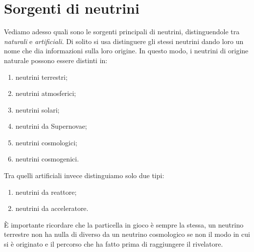     \section{Sorgenti di neutrini}
        Vediamo adesso quali sono le sorgenti principali di neutrini, distinguendole tra \emph{naturali} e \emph{artificiali}. Di solito si usa distinguere gli stessi neutrini dando loro un nome che dia informazioni sulla loro origine. In questo modo, i neutrini di origine naturale possono essere distinti in:
        \begin{enumerate}[label = $\star$]
            \item neutrini terrestri;
            \item neutrini atmosferici;
            \item neutrini solari;
            \item neutrini da Supernovae;
            \item neutrini cosmologici;
            \item neutrini cosmogenici.
        \end{enumerate}
        Tra quelli artificiali invece distinguiamo solo due tipi:
        \begin{enumerate}[label = $\star$]
            \item neutrini da reattore;
            \item neutrini da acceleratore.
        \end{enumerate}
        È importante ricordare che la particella in gioco è sempre la stessa, un neutrino terrestre non ha nulla di diverso da un neutrino cosmologico se non il modo in cui si è originato e il percorso che ha fatto prima di raggiungere il rivelatore.

